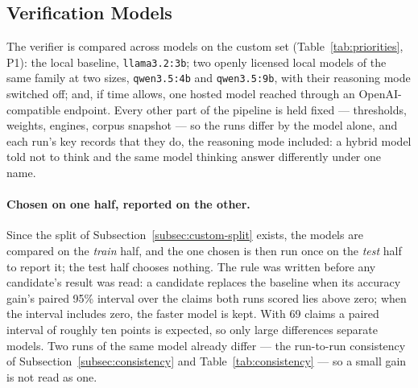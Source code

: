 
\subsection{Verification Models}
\label{subsec:benchmark-verification}

The verifier is compared across models on the custom set
(Table~\ref{tab:priorities}, P1): the local baseline,
\texttt{llama3.2:3b}; two openly licensed local models of the same
family at two sizes, \texttt{qwen3.5:4b} and \texttt{qwen3.5:9b}, with
their reasoning mode switched off; and, if time allows, one hosted model
reached through an OpenAI-compatible endpoint. Every other part of the
pipeline is held fixed --- thresholds, weights, engines, corpus
snapshot --- so the runs differ by the model alone, and each run's key
records that they do, the reasoning mode included: a hybrid model told
not to think and the same model thinking answer differently under one
name.

\paragraph{Chosen on one half, reported on the other.} Since the split
of Subsection~\ref{subsec:custom-split} exists, the models are compared on the
\emph{train} half, and the one chosen is then run once on the
\emph{test} half to report it; the test half chooses nothing. The rule
was written before any candidate's result was read: a candidate replaces
the baseline when its accuracy gain's paired 95\% interval over the
claims both runs scored lies above zero; when the interval includes
zero, the faster model is kept. With 69 claims a paired interval of
roughly ten points is expected, so only large differences separate
models. Two runs of the same model already differ --- the run-to-run
consistency of Subsection~\ref{subsec:consistency} and Table~\ref{tab:consistency} --- so a
small gain is not read as one.

